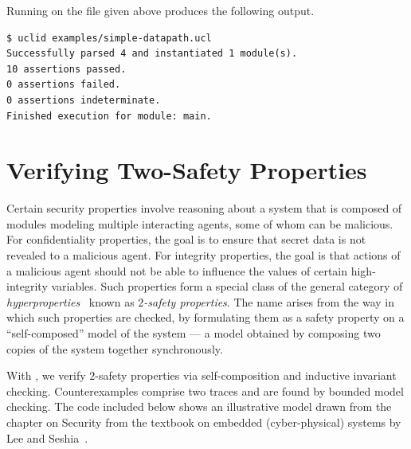     


Running \uclid{} on the file given above produces the following output.

\begin{Verbatim}[frame=single, samepage=true]
$ uclid examples/simple-datapath.ucl
Successfully parsed 4 and instantiated 1 module(s).
10 assertions passed.
0 assertions failed.
0 assertions indeterminate.
Finished execution for module: main.
\end{Verbatim}

\section{Verifying Two-Safety Properties}

Certain security properties involve reasoning about a system
that is composed of modules modeling
multiple interacting agents, some of whom can be malicious. 
For confidentiality
properties, the goal is to ensure that secret data is not revealed to a malicious
agent. For integrity properties, the goal is that actions of a malicious agent
should not be able to influence the values of certain high-integrity variables.
Such properties form a special class of the general category of {\em hyperproperties}~\cite{clarkson-jcs10}
known as {\em $2$-safety properties}. The name arises from the way in which
such properties are checked, by formulating them as a safety property on a
``self-composed'' model of the system --- a model obtained by composing two
copies of the system together synchronously.

With \uclid{}, we verify $2$-safety properties via self-composition and
inductive invariant checking. Counterexamples comprise two traces
and are found by bounded model checking.
The code included below shows an
illustrative \uclid{} model drawn from the chapter on Security from the textbook
on embedded (cyber-physical) systems by Lee and Seshia~\cite{leeseshia-16}.

    

